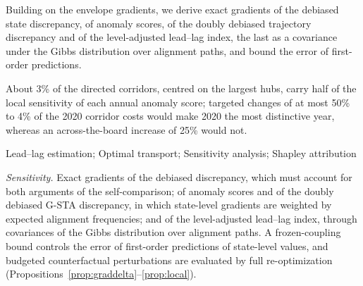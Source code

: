 
 Building on the envelope gradients, we derive exact gradients of the debiased state discrepancy, of anomaly scores, of the doubly debiased trajectory discrepancy and of the level-adjusted lead--lag index, the last as a covariance under the Gibbs distribution over alignment paths, and bound the error of first-order predictions.

 About 3\% of the directed corridors, centred on the largest hubs, carry half of the local sensitivity of each annual anomaly score; targeted changes of at most 50\% to 4\% of the 2020 corridor costs would make 2020 the most distinctive year, whereas an across-the-board increase of 25\% would not.

Lead--lag estimation; Optimal transport; Sensitivity analysis; Shapley attribution

\item \emph{Sensitivity.} Exact gradients of the debiased discrepancy, which must account for both arguments of the self-comparison; of anomaly scores and of the doubly debiased G-STA discrepancy, in which state-level gradients are weighted by expected alignment frequencies; and of the level-adjusted lead--lag index, through covariances of the Gibbs distribution over alignment paths. A frozen-coupling bound controls the error of first-order predictions of state-level values, and budgeted counterfactual perturbations are evaluated by full re-optimization (Propositions~\ref{prop:graddelta}--\ref{prop:local}).

